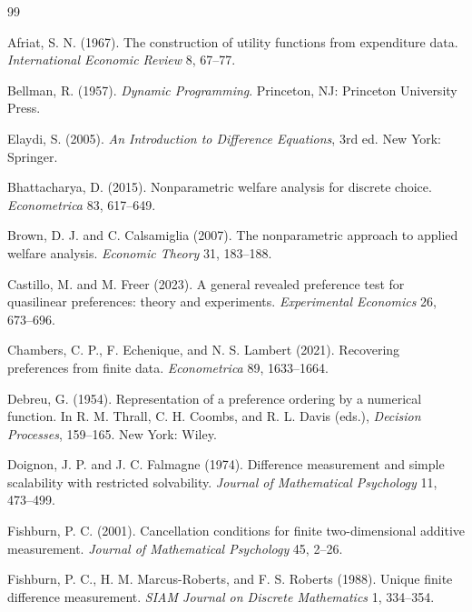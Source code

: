 \begin{thebibliography}{99}

Afriat, S. N. (1967).
The construction of utility functions from expenditure data.
\emph{International Economic Review} 8, 67--77.

Bellman, R. (1957).
\emph{Dynamic Programming}.
Princeton, NJ: Princeton University Press.

Elaydi, S. (2005).
\emph{An Introduction to Difference Equations}, 3rd ed.
New York: Springer.

Bhattacharya, D. (2015).
Nonparametric welfare analysis for discrete choice.
\emph{Econometrica} 83, 617--649.

Brown, D. J. and C. Calsamiglia (2007).
The nonparametric approach to applied welfare analysis.
\emph{Economic Theory} 31, 183--188.

Castillo, M. and M. Freer (2023).
A general revealed preference test for quasilinear preferences: theory and experiments.
\emph{Experimental Economics} 26, 673--696.

Chambers, C. P., F. Echenique, and N. S. Lambert (2021).
Recovering preferences from finite data.
\emph{Econometrica} 89, 1633--1664.

Debreu, G. (1954).
Representation of a preference ordering by a numerical function.
In R. M. Thrall, C. H. Coombs, and R. L. Davis (eds.), \emph{Decision Processes}, 159--165. New York: Wiley.

Doignon, J. P. and J. C. Falmagne (1974).
Difference measurement and simple scalability with restricted solvability.
\emph{Journal of Mathematical Psychology} 11, 473--499.

Fishburn, P. C. (2001).
Cancellation conditions for finite two-dimensional additive measurement.
\emph{Journal of Mathematical Psychology} 45, 2--26.

Fishburn, P. C., H. M. Marcus-Roberts, and F. S. Roberts (1988).
Unique finite difference measurement.
\emph{SIAM Journal on Discrete Mathematics} 1, 334--354.


\end{thebibliography}
